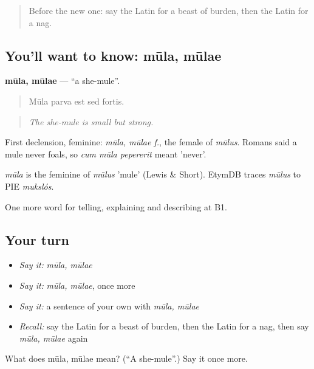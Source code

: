 \label{lesson:LA-C433-mula}



\begin{quote}
Before the new one: say the Latin for a beast of burden, then the Latin for a nag.
\end{quote}

\subsection*{You'll want to know: mūla, mūlae}
\textbf{mūla, mūlae} — \textquotedblleft{}a she-mule\textquotedblright{}.

\begin{quote}
Mūla parva est sed fortis.
\end{quote}

\begin{quote}
\emph{The she-mule is small but strong.}
\end{quote}

First declension, feminine: \emph{mūla, mūlae f.}, the female of \emph{mūlus}. Romans said a mule never foals, so \emph{cum mūla pepererit} meant 'never'.

\begin{cousinweb}
\emph{mūla} is the feminine of \emph{mūlus} 'mule' (Lewis \& Short). EtymDB traces \emph{mūlus} to PIE \emph{mukslós}.
\end{cousinweb}

\begin{grammarlens}[title={What you've built}]
One more word for telling, explaining and describing at B1.
\end{grammarlens}

\subsection*{Your turn}
\begin{itemize}
\raggedright
  \item \emph{Say it:} \emph{mūla, mūlae}
  \item \emph{Say it:} \emph{mūla, mūlae}, once more
  \item \emph{Say it:} a sentence of your own with \emph{mūla, mūlae}
  \item \emph{Recall:} say the Latin for a beast of burden, then the Latin for a nag, then say \emph{mūla, mūlae} again
\end{itemize}

\begin{tcolorbox}[breakable,colback=teal!4,colframe=teal!35!black,title={Before you move on}]
What does mūla, mūlae mean? (\textquotedblleft{}A she-mule\textquotedblright{}.) Say it once more.
\end{tcolorbox}
